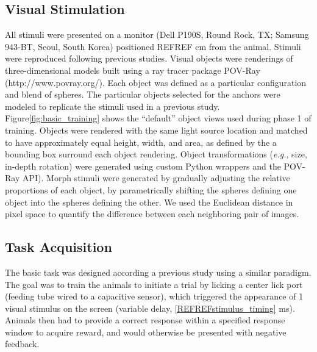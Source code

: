 \subsection{Visual Stimulation}
All stimuli were presented on a monitor (Dell P190S,
Round Rock, TX; Samsung 943-BT, Seoul, South Korea) positioned REFREF cm from the animal. Stimuli were reproduced following previous studies\cite{Zoccolan2009}. Visual objects were renderings of three-dimensional models built using a ray tracer package POV-Ray (http://www.povray.org/). Each object was defined as a particular configuration and blend of spheres. The particular objects selected for the anchors were modeled to replicate the stimuli used in a previous study\cite{Zoccolan2009}. Figure\ref{fig:basic_training} shows the ``default'' object views used during phase 1 of training. Objects were rendered with the same light source location and matched to have approximately equal height, width, and area, as defined by the a bounding box surround each object rendering. Object transformations (\textit{e.g.}, size, in-depth rotation) were generated using custom Python wrappers and the POV-Ray API). Morph stimuli were generated by gradually adjusting the relative proportions of each object, by parametrically shifting the spheres defining one object into the spheres defining the other. We used the Euclidean distance in pixel space to quantify the difference between each neighboring pair of images. 

\subsection{Task Acquisition}
The basic task was designed according a previous study using a similar paradigm\cite{Zoccolan2009}. The goal was to train the animals to initiate a trial by licking a center lick port (feeding tube wired to a capacitive sensor), which triggered the appearance of 1 visual stimulus on the screen (variable delay, \ref{REFREFstimulus_timing}  ms). Animals then had to provide a correct response within a specified response window to acquire reward, and would otherwise be presented with negative feedback. 

